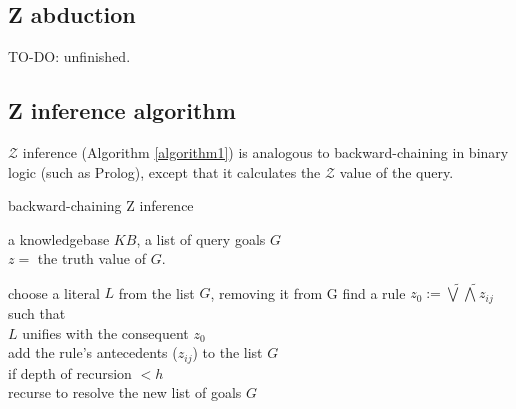 \subsection{Z abduction}

TO-DO:  unfinished.

%
%

\subsection{Z inference algorithm}
\label{sec:pureZinference}

$\mathcal{Z}$ inference (Algorithm \ref{algorithm1}) is analogous to backward-chaining in binary logic (such as Prolog), except that it calculates the $\mathcal{Z}$ value of the query.

\begin{algorithm}
\caption{backward-chaining Z inference}
\label{algorithm1}
\begin{algorithmic}[1]

\REQUIRE a knowledgebase $KB$, a list of query goals $G$ \\
\ENSURE $z =$ the truth value of $G$.

\REPEAT
	\STATE choose a literal $L$ from the list $G$, removing it from G
	\STATE find a rule $z_0 := \widetilde{\bigvee} \widetilde{\bigwedge} z_{ij} $ such that\\
			 $L$ unifies with the consequent $z_0$ \\
	\STATE add the rule's antecedents ($z_{ij}$) to the list $G$ \\
	\STATE if depth of recursion $< h$ \\
			 recurse to resolve the new list of goals $G$ \\

\end{algorithmic}
\end{algorithm}


